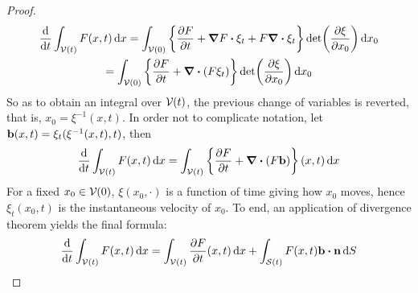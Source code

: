 \begin{proof}
\begin{multline*}
		\frac{\dd}{\dd{t}} \int_\cvt F(x, t) \dd{x} = 
		\int_{\cv{}(0)} 
		\left\{
		\frac{\partial F}{\partial t} + \grad{F} \vdot \xi_t + F \div{\xi_t}
		\right\} \det(\frac{\partial \xi}{\partial x_0}) \dd{x_0} 
		\\ = 
		\int_{\cv{}(0)} 
		\left\{	\frac{\partial F}{\partial t} + \div(F \xi_t) \right\} \det(\frac{\partial \xi}{\partial x_0}) \dd{x_0}
	\end{multline*}
	So as to obtain an integral over $\mathcal{V}_{}(t)$, the previous change of
	variables is reverted, that is, $x_0 = \xi^{-1}(x, t)$. In order
	not to complicate notation, let $\vb{b}(x,t) =
	\xi_t(\xi^{-1}(x,t),t)$, then
	\begin{equation*}
		\frac{\dd}{\dd{t}} \int_{\mathcal{V}(t)} F(x, t) \dd{x} = 
		\int_{\mathcal{V}(t)} 
		\left\{ \frac{\partial F}{\partial t}  + \div(F \vb{b}) \right\} (x, t) \dd{x}
	\end{equation*}
	For a fixed $x_0 \in \mathcal{V}_{}(0)$, $\xi(x_0, \cdot)$ is a function of
	time giving how $x_0$ moves, hence $\xi_t(x_0, t)$ is the
	instantaneous velocity of $x_0$. To end, an application of divergence
	theorem yields the final formula:
	\begin{equation*}
		\frac{\dd}{\dd{t}} \int_\cvt F(x, t) \dd{x} = 
		\int_\cvt \frac{\partial F}{\partial t} (x, t) \dd{x} +
		\int_\cst F(x, t) \vb{b} \vdot \vb{n} \dd{S}
	\end{equation*}
\end{proof}







